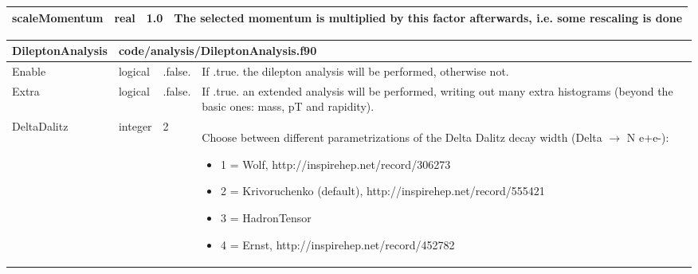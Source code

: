 \documentclass{article}
\begin{document}
\begin{longtable}{llll}
\midrule
scaleMomentum & \begin{minipage}[t]{2cm}real\end{minipage} & \begin{minipage}[t]{2cm}1.0\end{minipage} & \begin{minipage}[t]{12cm}The selected momentum is multiplied by this factor afterwards, i.e. some rescaling is done\end{minipage}\\*
\bottomrule
\end{longtable}
{ }




\begin{longtable}{llll}
\toprule
\textbf{\large{DileptonAnalysis}} & \multicolumn{3}{l}{\footnotesize{code/analysis/DileptonAnalysis.f90}}\\*
\midrule
\endfirsthead
\midrule
\endhead
Enable & \begin{minipage}[t]{2cm}logical\end{minipage} & \begin{minipage}[t]{2cm}.false.\end{minipage} & \begin{minipage}[t]{12cm}If .true. the dilepton analysis will be performed, otherwise not.\end{minipage}\\*
\midrule
Extra & \begin{minipage}[t]{2cm}logical\end{minipage} & \begin{minipage}[t]{2cm}.false.\end{minipage} & \begin{minipage}[t]{12cm}If .true. an extended analysis will be performed, writing out many extra histograms (beyond the basic ones: mass, pT and rapidity).\end{minipage}\\*
\midrule
DeltaDalitz & \begin{minipage}[t]{2cm}integer\end{minipage} & \begin{minipage}[t]{2cm}2\end{minipage} & \begin{minipage}[t]{12cm}Choose between different parametrizations of the Delta Dalitz decay width (Delta $\rightarrow$ N e+e-):\begin{itemize}\leftmargin0em\itemindent0pt\item 1 = Wolf, http://inspirehep.net/record/306273\item 2 = Krivoruchenko (default), http://inspirehep.net/record/555421\item 3 = HadronTensor\item 4 = Ernst, http://inspirehep.net/record/452782\end{itemize}\end{minipage}\\*

\end{longtable}
\end{document}
